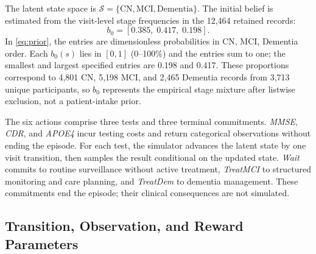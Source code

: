 \documentclass[conference,a4paper]{IEEEtran}
\begin{document}
The latent state space is $\mathcal{S} = \{\mathrm{CN}, \mathrm{MCI},
\mathrm{Dementia}\}$. The initial belief is estimated from the
visit-level stage frequencies in the 12,464 retained records:
\begin{equation}
b_0 = [0.385,\; 0.417,\; 0.198].
\label{eq:prior}
\end{equation}
In \eqref{eq:prior}, the entries are dimensionless probabilities in
CN, MCI, Dementia order. Each $b_0(s)$ lies in $[0,1]$
(0--100\%) and the entries sum to one; the smallest and largest
specified entries are 0.198 and 0.417. These proportions correspond to 4,801 CN, 5,198 MCI, and 2,465 Dementia
records from 3,713 unique participants, so $b_0$ represents the
empirical stage mixture after listwise exclusion, not a patient-intake prior.

The six actions comprise three tests and three terminal commitments.
\textit{MMSE}, \textit{CDR}, and \textit{APOE4} incur testing costs
and return categorical observations without ending the episode.
For each test, the simulator advances the latent state by one visit
transition, then samples the result conditional on the updated state.
\textit{Wait} commits to routine surveillance without active treatment,
\textit{TreatMCI} to structured monitoring and care planning, and
\textit{TreatDem} to dementia management. These commitments end the
episode; their clinical consequences are not simulated.

\subsection{Transition, Observation, and Reward Parameters}
\end{document}
